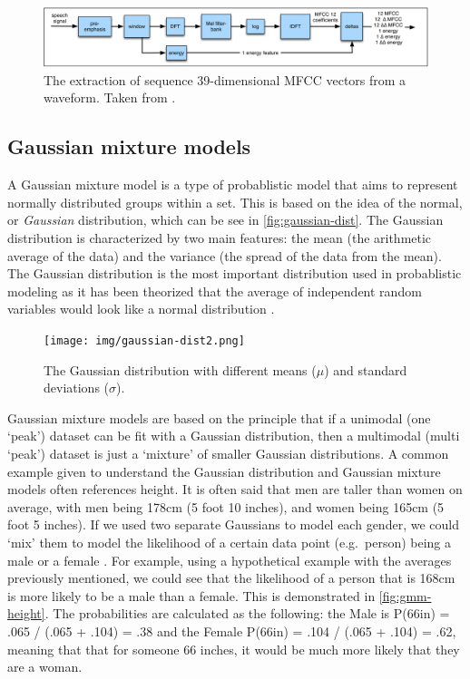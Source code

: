 \documentclass
[
    a4paper,
    twoside,
    12pt,
]
{report}
\begin{document}
\begin{figure}[]
\centering
\includegraphics[scale=0.24]{img/mfcc-extraction.png}
\caption{The extraction of sequence 39-dimensional MFCC vectors from a waveform. Taken from \textcite{jurafsky2009}.}
\label{fig:mfcc-extraction}
\end{figure}

\subsection{Gaussian mixture models}

A Gaussian mixture model is a type of probablistic model that aims to
represent normally distributed groups within a set. This is based on the
idea of the normal, or \emph{Gaussian} distribution, which can be see in
\autoref{fig:gaussian-dist}. The Gaussian distribution is characterized
by two main features: the mean (the arithmetic average of the data) and
the variance (the spread of the data from the mean). The Gaussian
distribution is the most important distribution used in probablistic
modeling as it has been theorized that the average of independent random
variables would look like a normal distribution
\parencite{mcgonagle2016}.

\begin{figure}[]
\centering
\texttt{[image: img/gaussian-dist2.png]}
\caption{The Gaussian distribution with different means (\( \mu \)) and standard deviations (\( \sigma \)).}
\label{fig:gaussian-dist}
\end{figure}

Gaussian mixture models are based on the principle that if a unimodal
(one `peak') dataset can be fit with a Gaussian distribution, then a
multimodal (multi `peak') dataset is just a `mixture' of smaller
Gaussian distributions. A common example given to understand the
Gaussian distribution and Gaussian mixture models often references
height. It is often said that men are taller than women on average, with
men being 178cm (5 foot 10 inches), and women being 165cm (5 foot 5
inches). If we used two separate Gaussians to model each gender, we
could `mix' them to model the likelihood of a certain data point
(e.g.~person) being a male or a female \parencite{mcgonagle2016}. For
example, using a hypothetical example with the averages previously
mentioned, we could see that the likelihood of a person that is 168cm is
more likely to be a male than a female. This is demonstrated in
\autoref{fig:gmm-height}. The probabilities are calculated as the
following: the Male is P(66in) = .065 / (.065 + .104) = .38 and the
Female P(66in) = .104 / (.065 + .104) = .62, meaning that that for
someone 66 inches, it would be much more likely that they are a woman.
\end{document}
